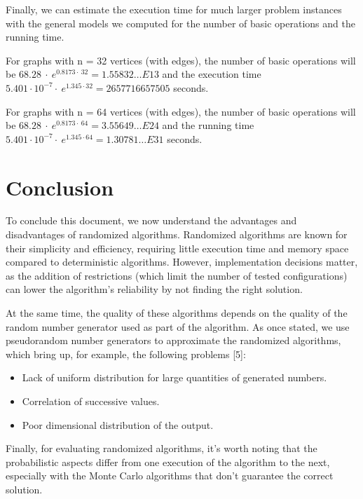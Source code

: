 \documentclass[]{revdetua}
\begin{document}
Finally, we can estimate the execution time for much larger problem instances with the general models we computed for the number of basic operations and the running time.

For graphs with n = 32 vertices (with edges), the number of basic operations will be  \(68.28\:\cdot \:e^{0.8173\cdot \:32} =1.55832\dots E13\) and the execution time \(5.401\cdot 10^{-7}\cdot \:e^{1.345\cdot 32} = 2657716657505\) seconds.

For graphs with n = 64 vertices (with edges), the number of basic operations will be \(68.28\:\cdot \:e^{0.8173\cdot \:64} = 3.55649\dots E24 \) and the running time \(5.401\cdot 10^{-7}\cdot \:e^{1.345\cdot 64} = 1.30781\dots E31\) seconds.

\section{Conclusion}

To conclude this document, we now understand the advantages and disadvantages of randomized algorithms. Randomized algorithms are known for their simplicity and efficiency, requiring little execution time and memory space compared to deterministic algorithms. However, implementation decisions matter, as the addition of restrictions (which limit the number of tested configurations) can lower the algorithm's reliability by not finding the right solution.

At the same time, the quality of these algorithms depends on the quality of the random number generator used as part of the algorithm. As once stated, we use pseudorandom number generators to approximate the randomized algorithms, which bring up, for example, the following problems [5]: 

\begin{itemize}
\item Lack of uniform distribution for large quantities of generated numbers.
\item Correlation of successive values.
\item Poor dimensional distribution of the output.
\end{itemize}

Finally, for evaluating randomized algorithms, it's worth noting that the probabilistic aspects differ from one execution of the algorithm to the next, especially with the Monte Carlo algorithms that don't guarantee the correct solution.
\end{document}
